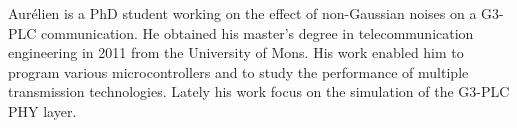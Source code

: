 Aurélien is a PhD student working on the effect of
non-Gaussian noises on a G3-PLC communication. He obtained
his master’s degree in telecommunication engineering in 2011
from the University of Mons. His work enabled him to program
various microcontrollers and to study the performance of
multiple transmission technologies. Lately his work focus on
the simulation of the G3-PLC PHY layer.
